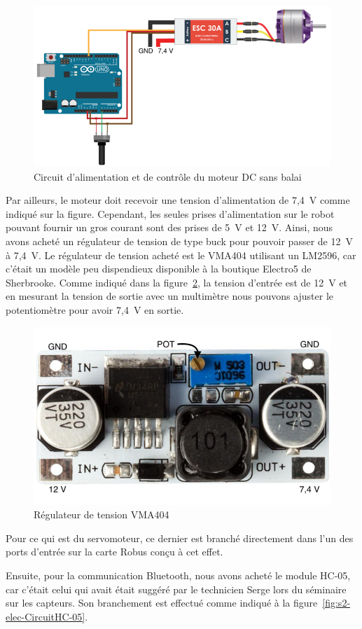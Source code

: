 \begin{figure}[t]
    \centering
    \includegraphics[width=0.8\linewidth]{img/s2/elec/CircuitMoteurDC}
    \caption{Circuit d'alimentation et de contrôle du moteur DC sans balai}
    \label{fig:s2-elec-CircuitMoteurDC}
\end{figure}

Par ailleurs, le moteur doit recevoir une tension d’alimentation de 7,4~V comme indiqué sur la figure.
Cependant, les seules prises d’alimentation sur le robot pouvant fournir un gros courant sont des prises de 5~V et 12~V.
Ainsi, nous avons acheté un régulateur de tension de type buck pour pouvoir passer de 12~V à 7,4~V.
Le régulateur de tension acheté est le VMA404 utilisant un LM2596, car c’était un modèle peu dispendieux disponible à la boutique Electro5 de Sherbrooke.
Comme indiqué dans la figure~\ref{fig:s2-elec-RegulateurTension}, la tension d’entrée est de 12~V et en mesurant la tension de sortie avec un multimètre nous pouvons ajuster le potentiomètre pour avoir 7,4~V en sortie.

\begin{figure}[h!]
    \centering
    \includegraphics[width=0.4\linewidth]{img/s2/elec/RegulateurTension}
    \caption{Régulateur de tension VMA404}
    \label{fig:s2-elec-RegulateurTension}
\end{figure}

Pour ce qui est du servomoteur, ce dernier est branché directement dans l’un des ports d’entrée sur la carte Robus conçu à cet effet.

Ensuite, pour la communication Bluetooth, nous avons acheté le module HC-05, car c’était celui qui avait était suggéré par le technicien Serge lors du séminaire sur les capteurs.
Son branchement est effectué comme indiqué à la figure~\ref{fig:s2-elec-CircuitHC-05}.

